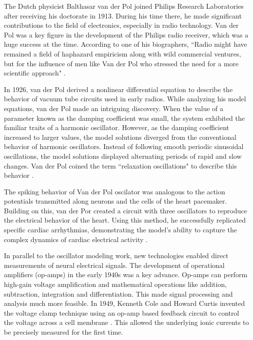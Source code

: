 The Dutch physicist Balthasar van der Pol joined Philips Research Laboratories after receiving his doctorate in 1913. During his time there, he made significant contributions to the field of electronics, especially in radio technology. Van der Pol was a key figure in the development of the Philips radio receiver, which was a huge success at the time. According to one of his biographers, ``Radio might have remained a field of haphazard empiricism along with wild commercial ventures, but for the influence of men like Van der Pol who stressed the need for a more scientific approach" \citep[Introduction]{vanderPol1960}.

In 1926, van der Pol derived a nonlinear differential equation to describe the behavior of vacuum tube circuits used in early radios. While analyzing his model equations, van der Pol made an intriguing discovery. When the value of a parameter known as the damping coefficient was small, the system exhibited the familiar traits of a harmonic oscillator. However, as the damping coefficient increased to larger values, the model solutions diverged from the conventional behavior of harmonic oscillators. Instead of following smooth periodic sinusoidal oscillations, the model solutions displayed alternating periods of rapid and slow changes. Van der Pol coined the term ``relaxation oscillations" to describe this behavior \citep{vanderPol1926}.

The spiking behavior of Van der Pol oscilator was analogous to the action potentials transmitted along neurons and the cells of the heart pacemaker. Building on this, van der Por created a circuit with three oscillators to reproduce the electrical behavior of the heart. Using this method, he successfully replicated specific cardiac arrhythmias, demonstrating the model's ability to capture the complex dynamics of cardiac electrical activity \citep{vanderPol1928}.

In parallel to the oscillator modeling work, new technologies enabled direct measurements of neural electrical signals. The development of operational amplifiers (op-amps) in the early 1940s was a key advance. Op-amps can perform high-gain voltage amplification and mathematical operations like addition, subtraction, integration and differentiation. This made signal processing and analysis much more feasible. In 1949, Kenneth Cole and Howard Curtis invented the voltage clamp technique using an op-amp based feedback circuit to control the voltage across a cell membrane \citep{Brown2020}. This allowed the underlying ionic currents to be precisely measured for the first time. 

